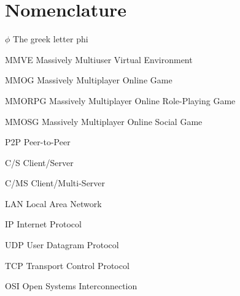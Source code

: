 \chapter{Nomenclature}

\newlength{\gnat}

\begin{Nomencl}[\gnat]

		\item[$\phi$]		The greek letter phi
		
		\item[MMVE]		Massively Multiuser Virtual Environment
        \item[MMOG]		Massively Multiplayer Online Game
        \item[MMORPG]   Massively Multiplayer Online Role-Playing Game
        \item[MMOSG]    Massively Multiplayer Online Social Game
        \item[P2P]      Peer-to-Peer
        \item[C/S]      Client/Server
        \item[C/MS]     Client/Multi-Server
        \item[LAN]      Local Area Network
        \item[IP]       Internet Protocol
        \item[UDP]      User Datagram Protocol
        \item[TCP]      Transport Control Protocol
        \item[OSI]      Open Systems Interconnection
\end{Nomencl}
\endinput
